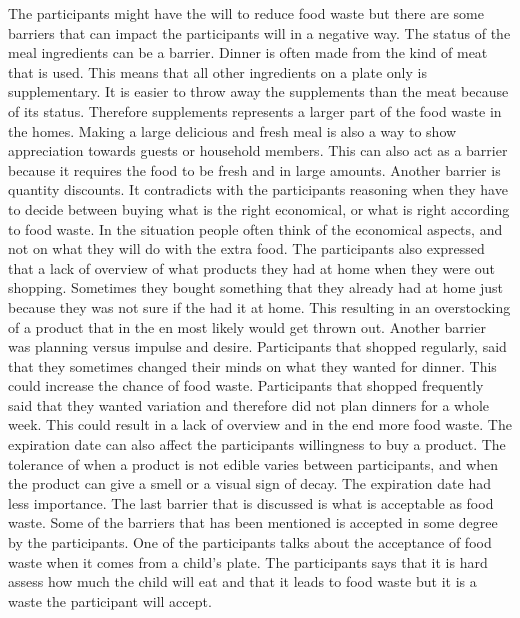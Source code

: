 The participants might have the will to reduce food waste but there are some barriers that can impact the participants will in a negative way. The status of the meal ingredients can be a barrier. Dinner is often made from the kind of meat that is used. This means that all other ingredients on a plate only is supplementary. It is easier to throw away the supplements than the meat because of its status. Therefore supplements represents a larger part of the food waste in the homes. Making a large delicious and fresh meal is also a way to show appreciation towards guests or household members. This can also act as a barrier because it requires the food to be fresh and in large amounts. Another barrier is quantity discounts. It contradicts with the participants reasoning when they have to decide between buying what is the right economical, or what is right according to food waste. In the situation people often think of the economical aspects, and not on what they will do with the extra food. The participants also expressed that a lack of overview of what products they had at home when they were out shopping. Sometimes they bought something that they already had at home just because they was not sure if the had it at home. This resulting in an overstocking of a product that in the en most likely would get thrown out. Another barrier was planning versus impulse and desire. Participants that shopped regularly, said that they sometimes changed their minds on what they wanted for dinner. This could increase the chance of food waste. Participants that shopped frequently said that they wanted variation and therefore did not plan dinners for a whole week. This could result in a lack of overview and in the end more food waste. The expiration date can also affect the participants willingness to buy a product. The tolerance of when a product is not edible varies between participants, and when the product can give a smell or a visual sign of decay. The expiration date had less importance. The last barrier that is discussed is what is acceptable as food waste. Some of the barriers that has been mentioned is accepted in some degree by the participants. One of the participants talks about the acceptance of food waste when it comes from a child's plate. The participants says that it is hard assess how much the child will eat and that it leads to food waste but it is a waste the participant will accept.